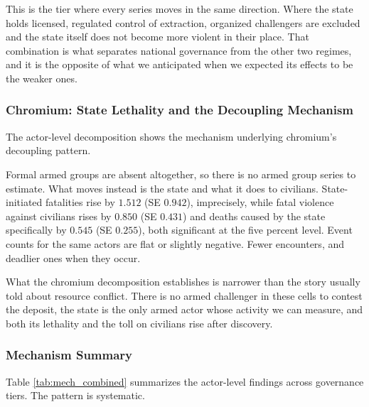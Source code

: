 \documentclass[11pt]{article}
\begin{document}
This is the tier where every series moves in the same direction. Where the state holds licensed, regulated control of extraction, organized challengers are excluded and the state itself does not become more violent in their place. That combination is what separates national governance from the other two regimes, and it is the opposite of what we anticipated when we expected its effects to be the weaker ones.

\subsubsection{Chromium: State Lethality and the Decoupling Mechanism}

The actor-level decomposition shows the mechanism underlying chromium's decoupling pattern.

Formal armed groups are absent altogether, so there is no armed group series to estimate. What moves instead is the state and what it does to civilians. State-initiated fatalities rise by $1.512$ (SE $0.942$), imprecisely, while fatal violence against civilians rises by $0.850$ (SE $0.431$) and deaths caused by the state specifically by $0.545$ (SE $0.255$), both significant at the five percent level. Event counts for the same actors are flat or slightly negative. Fewer encounters, and deadlier ones when they occur.

What the chromium decomposition establishes is narrower than the story usually told about resource conflict. There is no armed challenger in these cells to contest the deposit, the state is the only armed actor whose activity we can measure, and both its lethality and the toll on civilians rise after discovery.

\subsubsection{Mechanism Summary}

Table \ref{tab:mech_combined} summarizes the actor-level findings across governance tiers. The pattern is systematic.
\end{document}

